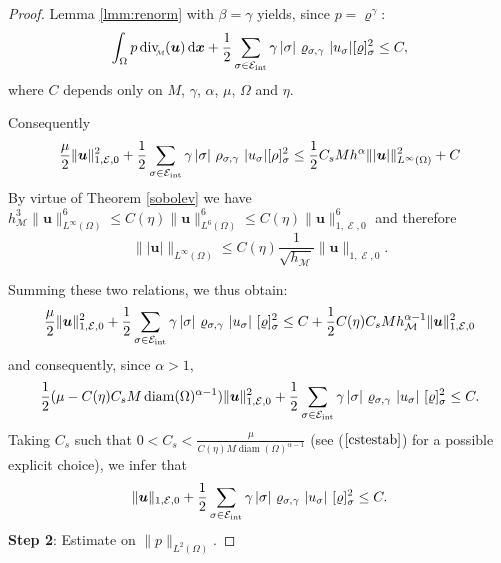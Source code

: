 \documentclass{amsart}
\numberwithin{equation}{section}
\begin{document}
\begin{proof}
Lemma \ref{lmm:renorm} with $\beta=\gamma$ yields, since $p={\varrho}^\gamma$:
\[
\int_\Omega p \, {{\rm div}_{\hspace{-0.2em}\raisebox{-0.1em}{\scalebox{0.5}{${{\mathcal M}}$}}}}({{\boldsymbol u}}) {\, {\rm d}{{\boldsymbol x}}} +\frac 1 2 
\sum_{{{\sigma}} \in {{\mathcal E}_{\rm int}}} \gamma\, |{{\sigma}}|\ {\varrho}_{{{\sigma}},\gamma}\ |{{u}_{{\sigma}}}|  [{\varrho}]_{{\sigma}}^2 \leq C,
\]
where $C$ depends only on ${M}$, $\gamma$, $\alpha$, $\mu$, $\Omega$ and $\eta$.

Consequently
\begin{equation*}
\frac{\mu}{2} \| {{\boldsymbol u}} \|_{1,\operatorname{{\mathcal{E}}},0}^2 +\frac 1 2 
\sum_{{{\sigma}} \in {{\mathcal E}_{\rm int}}} \gamma\, |{{\sigma}}|\ \rho_{{{\sigma}},\gamma}\ |{{u}_{{\sigma}}}|  [\rho]_{{\sigma}}^2  \le \frac{1}{2}{C_s} {M} h^\alpha \| | {{\boldsymbol u}} | \|_{L^\infty(\Omega)}^2 +C
\end{equation*}
By virtue of Theorem \ref{sobolev} we have $ h_{{\mathcal M}}^3 \| {{\boldsymbol u}} \|_{L^\infty (\Omega)}^6 \le C(\eta) \| {\bm{u}} \|_{L^6(\Omega)}^6 \le C(\eta) \| {{\boldsymbol u}} \|_{1,\operatorname{{\mathcal{E}}},0}^6 $ and therefore 
\begin{equation*}
\| | {{\boldsymbol u}} | \|_{L^\infty (\Omega)} \le C(\eta) \frac{1}{\sqrt{h_{{\mathcal M}}}} \| {{\boldsymbol u}} \|_{1,\operatorname{{\mathcal{E}}},0}.
\end{equation*}

Summing these two relations, we thus obtain:
\begin{equation}
\frac{\mu}{2} \| {{\boldsymbol u}} \|_{1,\operatorname{{\mathcal{E}}},0}^2 +\frac 1 2 
\sum_{{{\sigma}} \in {{\mathcal E}_{\rm int}}} \gamma\, |{{\sigma}}|\ {\varrho}_{{{\sigma}},\gamma}\ |{{u}_{{\sigma}}}|\ [{\varrho}]_{{\sigma}}^2 \leq C 
+ \frac{1}{2} C(\eta){C_s} M  h_{{\mathcal M}}^{\alpha-1} \| {{\boldsymbol u}} \|_{1,\operatorname{{\mathcal{E}}},0}^2
\label{stab1}\end{equation}
and consequently, since $\alpha > 1 $,
\begin{equation*}
\frac{1}{2} ( \mu - C(\eta) {C_s} M \operatorname{diam}(\Omega)^{\alpha-1} ) \| {{\boldsymbol u}} \|_{1,\operatorname{{\mathcal{E}}},0}^2+\frac 1 2 
\sum_{{{\sigma}} \in {{\mathcal E}_{\rm int}}} \gamma\, |{{\sigma}}|\ {\varrho}_{{{\sigma}},\gamma}\ |{{u}_{{\sigma}}}|\ [{\varrho}]_{{\sigma}}^2   \leq C.
\end{equation*}
Taking $ {C_s} $ such that $ 0 < {C_s} < \frac{\mu}{C(\eta) M \operatorname{diam}(\Omega)^{\alpha-1}} $ (see ($\ref{cstestab}$) for a possible explicit choice), we infer that
\begin{equation*}
\| {{\boldsymbol u}} \|_{1,\operatorname{{\mathcal{E}}},0} +\frac 1 2 
\sum_{{{\sigma}} \in {{\mathcal E}_{\rm int}}} \gamma\, |{{\sigma}}|\ {\varrho}_{{{\sigma}},\gamma}\ |{{u}_{{\sigma}}}|\ [{\varrho}]_{{\sigma}}^2  \leq C.
\end{equation*}
\textbf{Step 2}: Estimate on $ \| p \|_{L^2(\Omega)} $.


\end{proof}
\end{document}
